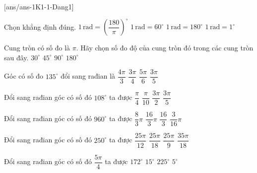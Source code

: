 [ans/ans-1K1-1-Dang1]
\begin{ex}%
	Chọn khẳng định đúng.
	\choice
	{\True $1\,\mathrm{rad}=\left(\dfrac{180}{\pi }\right)^\circ$}
	{$1\,\mathrm{rad}=60^\circ$}
	{$1\,\mathrm{rad}=180^\circ$}
	{$1\,\mathrm{rad}=1^\circ$}
\end{ex}
\begin{ex}%
	Cung tròn có số đo là $\pi$. Hãy chọn số đo độ của cung tròn đó trong các cung tròn sau đây.
	\choice
	{$30^{\circ}$}
	{$45^{\circ}$}
	{$90^{\circ}$}
	{\True $180^{\circ}$}
\end{ex}
\begin{ex}%
	Góc có số đo $135^{\circ}$ đổi sang rađian là
	\choice
	{$\dfrac{4\pi }{3}$}
	{\True $\dfrac{3\pi }{4}$}
	{$\dfrac{5\pi }{6}$}
	{$\dfrac{3\pi }{5}$}
\end{ex}
\begin{ex}%
	Đổi sang rađian góc có số đó $108^\circ$ ta được
	\choice
	{$\dfrac{\pi}{4}$}
	{$\dfrac{\pi}{10}$}
	{$\dfrac{3\pi}{2}$}
	{\True $\dfrac{3\pi}{5}$}
\end{ex}
\begin{ex}%
	Đổi sang rađian góc có số đó ${960}^{\circ}$ ta được
	\choice
	{$\dfrac{8}{3}\pi $}
	{\True $\dfrac{16}{3}\pi $}
	{$\dfrac{16}{3}$}
	{$\dfrac{3}{16}\pi $}
\end{ex}
\begin{ex}%
	Đổi sang rađian góc có số đó $250^\circ$ ta được
	\choice
	{\True $\dfrac{25\pi}{12}$}
	{$\dfrac{25\pi}{18}$}
	{$\dfrac{25\pi}{9}$}
	{$\dfrac{35\pi}{18}$}
\end{ex}
\begin{ex}%
	Đổi sang rađian góc có số đó $\dfrac{5\pi}{4}$ ta được
	\choice
	{$172^\circ$}
	{$15^\circ$}
	{\True $225^\circ$}
	{$5^\circ$}
\end{ex}
